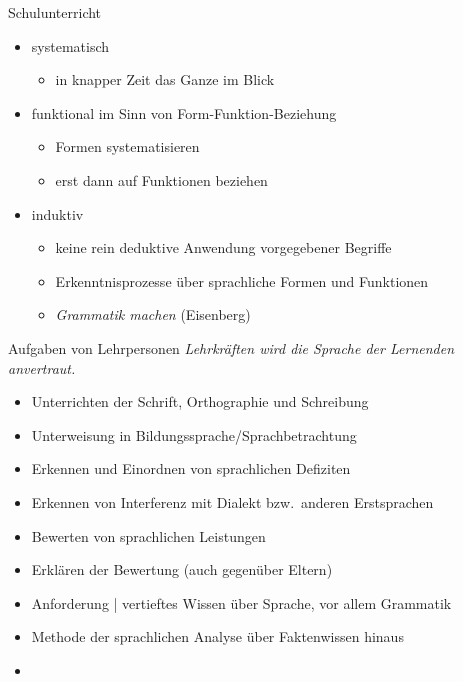 \begin{frame}
  {Schulunterricht}
  \onslide<+->
  \begin{itemize}[<+->]
    \item \alert{systematisch}
      \begin{itemize}
        \item in knapper Zeit das Ganze im Blick
      \end{itemize}
      \Zeile
    \item funktional im Sinn von \alert{Form-Funktion-Beziehung}
      \begin{itemize}
        \item Formen systematisieren
        \item erst dann auf Funktionen beziehen
      \end{itemize}
      \Zeile
    \item \alert{induktiv}
      \begin{itemize}
        \item keine rein deduktive Anwendung vorgegebener Begriffe
        \item Erkenntnisprozesse über sprachliche Formen und Funktionen
        \item \alert{\textit{Grammatik machen}} (Eisenberg)
      \end{itemize}
  \end{itemize}
\end{frame}

\begin{frame}
  {Aufgaben von Lehrpersonen}
  \onslide<+->
  \onslide<+->
  \alert{\textit{Lehrkräften wird die Sprache der Lernenden anvertraut.}} \\
  \Zeile
  \begin{itemize}[<+->]
    \item Unterrichten der Schrift, Orthographie und Schreibung
    \item Unterweisung in Bildungssprache\slash Sprachbetrachtung
    \item Erkennen und \alert{Einordnen} von \alert{sprachlichen Defiziten}
    \item Erkennen von \alert{Interferenz mit Dialekt bzw.\ anderen Erstsprachen}
    \item \alert{Bewerten} von sprachlichen Leistungen
    \item \alert{Erklären} der Bewertung (auch gegenüber Eltern)
      \Zeile
    \item[\ding{222}] Anforderung | vertieftes Wissen über Sprache, vor allem Grammatik
    \item[\ding{222}] Methode der sprachlichen Analyse über Faktenwissen hinaus
    \item[\ding{222}] 
  \end{itemize}
\end{frame}


